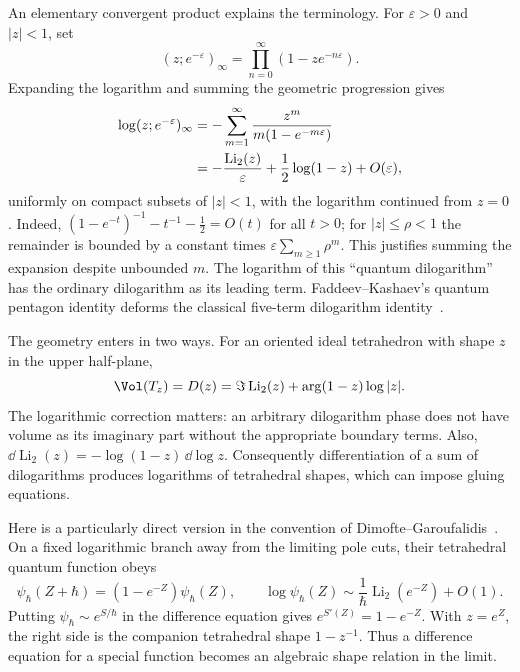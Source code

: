 An elementary convergent product explains the terminology. For
$\varepsilon>0$ and $|z|<1$, set
\[
 (z;e^{-\varepsilon})_\infty
      =\prod_{n=0}^\infty(1-ze^{-n\varepsilon}).
\]
Expanding the logarithm and summing the geometric progression gives
\begin{align}
 \log(z;e^{-\varepsilon})_\infty
 &=-\sum_{m=1}^\infty
       \frac{z^m}{m(1-e^{-m\varepsilon})}\notag\\
 &=-\frac{\operatorname{Li}_2(z)}{\varepsilon}
       +\frac12\log(1-z)+O(\varepsilon),
 \label{eq:introqpochhammer}
\end{align}
uniformly on compact subsets of $|z|<1$, with the logarithm
continued from $z=0$. Indeed,
$(1-e^{-t})^{-1}-t^{-1}-\tfrac12=O(t)$ for all $t>0$;
for $|z|\le\rho<1$ the remainder is bounded by a constant times
$\varepsilon\sum_{m\ge1}\rho^m$. This justifies summing the
expansion despite unbounded $m$.
The logarithm of this ``quantum dilogarithm'' has the ordinary
dilogarithm as its leading term. Faddeev--Kashaev's quantum
pentagon identity deforms the classical five-term dilogarithm
identity~\cite{FaddeevKashaev}.

The geometry enters in two ways. For an oriented ideal tetrahedron
with shape $z$ in the upper half-plane,
\begin{equation}
 \Vol(T_z)=D(z)
 =\Im\operatorname{Li}_2(z)+\arg(1-z)\log|z|.
 \label{eq:introBlochWigner}
\end{equation}
The logarithmic correction matters: an arbitrary dilogarithm phase
does not have volume as its imaginary part without the appropriate
boundary terms. Also,
$\dd\operatorname{Li}_2(z)=-\log(1-z)\,\dd\log z$.
Consequently differentiation of a sum of dilogarithms produces
logarithms of tetrahedral shapes, which can impose gluing equations.

Here is a particularly direct version in the convention of
Dimofte--Garoufalidis~\cite[Section 5.1]{DimofteGaroufalidis}.
On a fixed logarithmic branch away from the limiting pole cuts,
their tetrahedral quantum function obeys
\begin{equation}
 \psi_\hbar(Z+\hbar)=(1-e^{-Z})\psi_\hbar(Z),\qquad
 \log\psi_\hbar(Z)\sim\frac1\hbar\operatorname{Li}_2(e^{-Z})+O(1).
 \label{eq:introquantumshape}
\end{equation}
Putting $\psi_\hbar\sim e^{S/\hbar}$ in the difference equation
gives $e^{S'(Z)}=1-e^{-Z}$. With $z=e^Z$, the right side is
the companion tetrahedral shape $1-z^{-1}$. Thus a difference
equation for a special function becomes an algebraic shape relation
in the limit.

